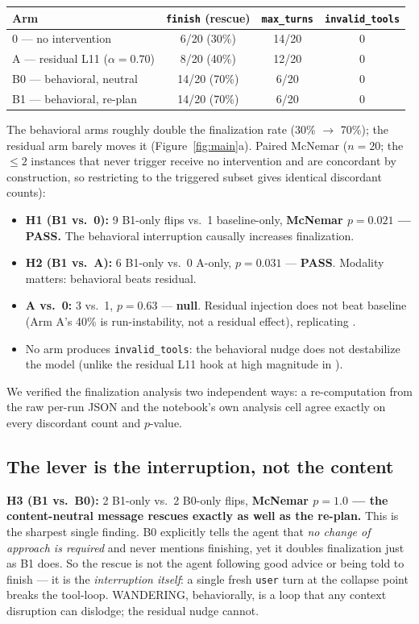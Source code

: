 \documentclass[11pt]{article}
\begin{document}
\begin{center}
\begin{tabular}{lccc}
\toprule
Arm & \texttt{finish} (rescue) & \texttt{max\_turns} & \texttt{invalid\_tools} \\
\midrule
0 --- no intervention & 6/20 (30\%) & 14/20 & 0 \\
A --- residual L11 ($\alpha{=}0.70$) & 8/20 (40\%) & 12/20 & 0 \\
B0 --- behavioral, neutral & 14/20 (70\%) & 6/20 & 0 \\
B1 --- behavioral, re-plan & 14/20 (70\%) & 6/20 & 0 \\
\bottomrule
\end{tabular}
\end{center}

The behavioral arms roughly double the finalization rate (30\% $\to$ 70\%); the residual arm barely moves it (Figure~\ref{fig:main}a). Paired McNemar ($n{=}20$; the $\leq 2$ instances that never trigger receive no intervention and are concordant by construction, so restricting to the triggered subset gives identical discordant counts):
\begin{itemize}
\item \textbf{H1 (B1 vs.\ 0):} 9 B1-only flips vs.\ 1 baseline-only, \textbf{McNemar $p=0.021$ --- PASS.} The behavioral interruption causally increases finalization.
\item \textbf{H2 (B1 vs.\ A):} 6 B1-only vs.\ 0 A-only, $p=0.031$ --- \textbf{PASS}. Modality matters: behavioral beats residual.
\item \textbf{A vs.\ 0:} 3 vs.\ 1, $p=0.63$ --- \textbf{null}. Residual injection does not beat baseline (Arm A's 40\% is run-instability, not a residual effect), replicating \cite{residual_nulls}.
\item No arm produces \texttt{invalid\_tools}: the behavioral nudge does not destabilize the model (unlike the residual L11 hook at high magnitude in \cite{residual_nulls}).
\end{itemize}
We verified the finalization analysis two independent ways: a re-computation from the raw per-run JSON and the notebook's own analysis cell agree exactly on every discordant count and $p$-value.

\subsection{The lever is the interruption, not the content}

\textbf{H3 (B1 vs.\ B0):} 2 B1-only vs.\ 2 B0-only flips, \textbf{McNemar $p=1.0$ --- the content-neutral message rescues exactly as well as the re-plan.} This is the sharpest single finding. B0 explicitly tells the agent that \emph{no change of approach is required} and never mentions finishing, yet it doubles finalization just as B1 does. So the rescue is not the agent following good advice or being told to finish --- it is the \emph{interruption itself}: a single fresh \texttt{user} turn at the collapse point breaks the tool-loop. WANDERING, behaviorally, is a loop that any context disruption can dislodge; the residual nudge cannot.
\end{document}
